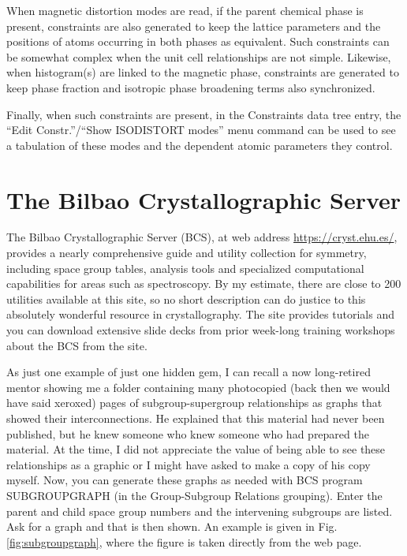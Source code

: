 When magnetic distortion modes are read, if the parent chemical phase is present, constraints are also generated to keep the lattice parameters and the positions of atoms occurring in both phases as equivalent. Such constraints can be somewhat complex when the unit cell relationships are not simple. Likewise, when histogram(s) are linked to the magnetic phase, constraints are generated to keep phase fraction and isotropic phase broadening terms also synchronized. 

Finally, when such constraints are present, in the Constraints data tree entry, the ``Edit Constr.''/``Show ISODISTORT modes'' menu command can be used to see a tabulation of these modes and the dependent atomic parameters they control. 

\section{The Bilbao Crystallographic Server}\label{ref:BCS}
The Bilbao Crystallographic Server (BCS), at web address \url{https://cryst.ehu.es/}, provides a nearly comprehensive guide and utility collection for symmetry, including space group tables, analysis tools and specialized computational capabilities for areas such as spectroscopy. By my estimate, there are close to 200 utilities available at this site, so no short description can do justice to this absolutely wonderful resource in crystallography. The site provides tutorials and you can download extensive slide decks from prior week-long training workshops about the BCS from the site. 

As just one example of just one hidden gem,
I can recall a now long-retired mentor showing me a folder containing many photocopied (back then we would have said xeroxed) pages of subgroup-supergroup relationships as graphs that showed their interconnections. 
He explained that this material had never been published, but he knew someone who knew someone who had prepared the material. 
At the time, I did not appreciate the value of being able to see these relationships as a graphic or I might have asked to make a copy of his copy myself. 
Now, you can generate these graphs as needed with BCS program SUBGROUPGRAPH (in the Group-Subgroup Relations grouping). 
Enter the parent and child space group numbers and the intervening subgroups are listed. Ask for a graph and that is then shown. An example is given in Fig. \ref{fig:subgroupgraph}, where the figure is taken directly from the web page. 

